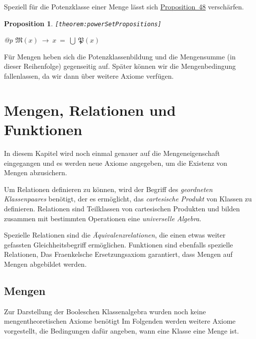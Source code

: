 \documentclass[a4paper,german,10pt,twoside]{book}
\newtheorem{prop}[thm]{Proposition}
\theoremstyle{definition}
\theoremstyle{remark}
\begin{document}
\par
Speziell f{\"u}r die Potenzklasse einer Menge l{\"a}sst sich \hyperlink{theorem:powerPropositions}{Proposition~48} versch{\"a}rfen.

\begin{prop}
\label{theorem:powerSetPropositions} \hypertarget{theorem:powerSetPropositions}{}
{\tt \tiny [\verb]theorem:powerSetPropositions]]}
\mbox{}
\begin{longtable}{{@{\extracolsep{\fill}}p{\linewidth}}}
\centering $\mathfrak{M}(x)\ \rightarrow\ x \ = \ \bigcup \ \mathfrak{P}(x)$
\end{longtable}

\end{prop}

F{\"u}r Mengen heben sich die Potenzklassenbildung und die Mengensumme (in dieser Reihenfolge) gegenseitig auf.
Sp{\"a}ter k{\"o}nnen wir die Mengenbedingung fallenlassen, da wir dann {\"u}ber weitere Axiome
verf{\"u}gen.




\chapter{Mengen, Relationen und Funktionen} \label{chapter5} \hypertarget{chapter5}{}

In diesem Kapitel wird noch einmal genauer auf die Mengeneigenschaft eingegangen und es werden neue Axiome angegeben, um die Existenz von Mengen abzusichern.

\par
Um Relationen definieren zu k{\"o}nnen, wird der Begriff des \emph{geordneten Klassenpaares} ben{\"o}tigt,
der es erm{\"o}glicht, das \emph{cartesische Produkt} von Klassen zu definieren. Relationen sind
Teilklassen von cartesischen Produkten und bilden zusammen mit bestimmten Operationen eine
\emph{universelle Algebra}. 

\par
Spezielle Relationen sind die \emph{{\"A}quivalenzrelationen}, die einen etwas
weiter gefassten Gleichheitsbegriff erm{\"o}glichen. Funktionen sind ebenfalls spezielle Relationen,
Das Fraenkelsche Ersetzungsaxiom garantiert, dass Mengen auf Mengen abgebildet werden.

\section{Mengen} \label{chapter5_section1} \hypertarget{chapter5_section1}{}
Zur Darstellung der Booleschen Klassenalgebra wurden noch keine mengentheoretischen Axiome ben{\"o}tigt
Im Folgenden werden weitere Axiome vorgestellt, die Bedingungen daf{\"u}r angeben, wann eine Klasse
eine Menge ist.
\end{document}
